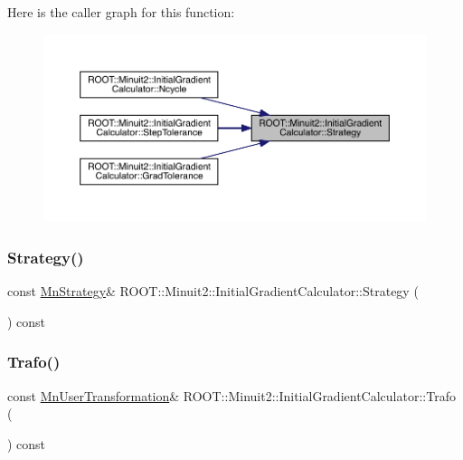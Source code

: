 Here is the caller graph for this function\+:
\nopagebreak
\begin{figure}[H]
\begin{center}
\leavevmode
\includegraphics[width=350pt]{d3/dcf/classROOT_1_1Minuit2_1_1InitialGradientCalculator_ac8fb719893c5d2959ba9d784c8c2e887_icgraph}
\end{center}
\end{figure}
\mbox{\label{classROOT_1_1Minuit2_1_1InitialGradientCalculator_ac8fb719893c5d2959ba9d784c8c2e887}} 
\subsubsection{\texorpdfstring{Strategy()}{Strategy()}\hspace{0.1cm}{\footnotesize\ttfamily [3/3]}}
{\footnotesize\ttfamily const \mbox{\hyperlink{classROOT_1_1Minuit2_1_1MnStrategy}{Mn\+Strategy}}\& R\+O\+O\+T\+::\+Minuit2\+::\+Initial\+Gradient\+Calculator\+::\+Strategy (\begin{DoxyParamCaption}{ }\end{DoxyParamCaption}) const\hspace{0.3cm}{\ttfamily [inline]}}

\mbox{\label{classROOT_1_1Minuit2_1_1InitialGradientCalculator_aba7febb81b50fd961a9f7f754413a5c9}} 
\subsubsection{\texorpdfstring{Trafo()}{Trafo()}\hspace{0.1cm}{\footnotesize\ttfamily [1/3]}}
{\footnotesize\ttfamily const \mbox{\hyperlink{classROOT_1_1Minuit2_1_1MnUserTransformation}{Mn\+User\+Transformation}}\& R\+O\+O\+T\+::\+Minuit2\+::\+Initial\+Gradient\+Calculator\+::\+Trafo (\begin{DoxyParamCaption}{ }\end{DoxyParamCaption}) const\hspace{0.3cm}{\ttfamily [inline]}}

